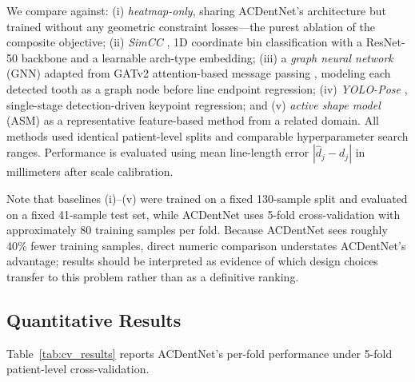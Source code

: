 \documentclass[conference]{IEEEtran}
\begin{document}
We compare against: (i) \textit{heatmap-only}, sharing ACDentNet's architecture but trained
without any geometric constraint losses---the purest ablation of the composite objective;
(ii) \textit{SimCC} \cite{li2022simcc}, 1D coordinate bin classification with a ResNet-50
backbone and a learnable arch-type embedding; (iii) a \textit{graph neural network} (GNN)
adapted from GATv2 attention-based message passing \cite{brody2022gatv2}, modeling each
detected tooth as a graph node before line endpoint regression; (iv) \textit{YOLO-Pose}
\cite{maji2022yolo}, single-stage detection-driven keypoint regression; and (v) \textit{active
shape model} (ASM) \cite{cootes1995asm} as a representative feature-based method from a
related domain. All methods used identical patient-level splits and comparable hyperparameter
search ranges. Performance is evaluated using mean line-length error $|\hat{d}_j - d_j|$ in
millimeters after scale calibration.

Note that baselines (i)--(v) were trained on a fixed 130-sample split and evaluated on a fixed
41-sample test set, while ACDentNet uses 5-fold cross-validation with approximately 80 training
samples per fold. Because ACDentNet sees roughly 40\% fewer training samples, direct numeric
comparison understates ACDentNet's advantage; results should be interpreted as evidence of
which design choices transfer to this problem rather than as a definitive ranking.

\subsection{Quantitative Results}
\label{sec:quant}

Table~\ref{tab:cv_results} reports ACDentNet's per-fold performance under 5-fold
patient-level cross-validation.
\end{document}
